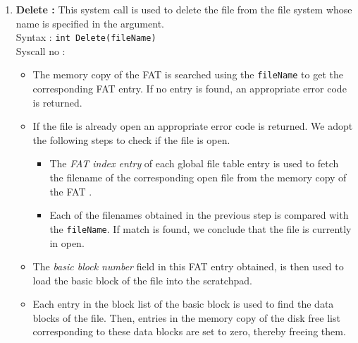 \begin{enumerate}
\begin{itemize}
		\item The global file table entry indexed by this local file table entry is removed. \footnote{A suggested way to remove an entry is to store an integer -1 in that word.} %
		
		\item The local file table entry of the process is then removed.
		
		\item The return value of this system call is 0 in case of success and the appropriate error code in case of failure.
	\end{itemize}

	\item \textbf{Delete :} This system call is used to delete the file from the file system whose name is specified in the argument. \\
	Syntax : \texttt{int Delete(fileName)} \\
	Syscall no : 
	\begin{itemize}
		\item The memory copy of the FAT  is searched using the \texttt{fileName} to get the corresponding FAT entry. If no entry is found, an appropriate error code is returned.
		
		\item If the file is already open an appropriate error code is returned. We adopt the following steps to check if the file is open.
		\begin{itemize}
			\item The \emph{FAT index entry} of each global file table entry is used to fetch the filename of the corresponding open file from the memory copy of the FAT .
			
			\item Each of the filenames obtained in the previous step is compared with the \texttt{fileName}. If match is found, we conclude that the file is currently in open.
		\end{itemize}
		\item The \emph{basic block number} field in this FAT entry obtained, is then used to load the basic block of the file into the scratchpad.
		
		\item Each entry in the block list of the basic block is used to find the data blocks of the file. Then, entries in the memory copy of the disk free list   corresponding to these data blocks are set to zero, thereby freeing them.
		

\end{itemize}
\end{enumerate}
